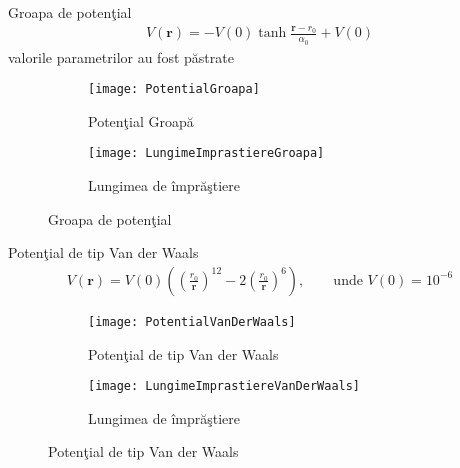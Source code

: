 \begin{frame}[allowframebreaks]{Groapa de poten\c{t}ial}
\begin{align}
V({\bm r})=-V(0)\tanh{\frac{{\bm r}-r_0}{\alpha_0}}+V(0)
\end{align}
valorile parametrilor au fost p\u{a}strate
\begin{figure}[h!]
\centering
\begin{subfigure}{.5\textwidth}
  \centering
  \texttt{[image: PotentialGroapa]}
  \caption{Poten\c{t}ial Groap\u{a}}
  \label{fig:sub321}
\end{subfigure}%
\begin{subfigure}{.5\textwidth}
  \centering
  \texttt{[image: LungimeImprastiereGroapa]}
  \caption{Lungimea de \^{i}mpr\u{a}\c{s}tiere}
  \label{fig:sub322}
\end{subfigure}
\caption{Groapa de poten\c{t}ial}
\label{fig:groapa}
\end{figure}
\end{frame}

\begin{frame}[allowframebreaks]{Poten\c{t}ial de tip Van der Waals}
\begin{align}
V({\bm r})=V(0)\left(\left(\frac{r_0}{{\bm r}}\right)^12-2\left(\frac{r_0}{{\bm r}}\right)^6\right), \qquad \text{unde } V(0)=10^{-6}
\end{align}

\begin{figure}[h!]
\centering
\begin{subfigure}{.5\textwidth}
  \centering
  \texttt{[image: PotentialVanDerWaals]}
  \caption{Poten\c{t}ial de tip Van der Waals}
  \label{fig:sub331}
\end{subfigure}%
\begin{subfigure}{.5\textwidth}
  \centering
  \texttt{[image: LungimeImprastiereVanDerWaals]}
  \caption{Lungimea de \^{i}mpr\u{a}\c{s}tiere}
  \label{fig:sub332}
\end{subfigure}
\caption{Poten\c{t}ial de tip Van der Waals}
\label{fig:groapa}
\end{figure}
\end{frame}

